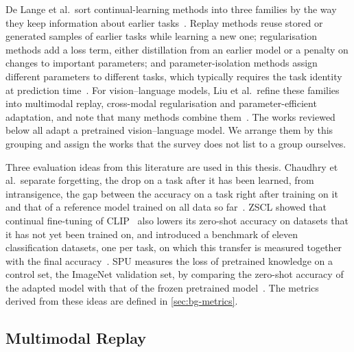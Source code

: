 De Lange et al.\ sort continual-learning methods into three families by the way they keep information about earlier tasks~\cite[Sec.~3]{delange2022}.
Replay methods reuse stored or generated samples of earlier tasks while learning a new one; regularisation methods add a loss term, either distillation from an earlier model or a penalty on changes to important parameters; and parameter-isolation methods assign different parameters to different tasks, which typically requires the task identity at prediction time~\cite[Sec.~3.1--3.3]{delange2022}.
For vision--language models, Liu et al.\ refine these families into multimodal replay, cross-modal regularisation and parameter-efficient adaptation, and note that many methods combine them~\cite[Sec.~4]{liu2026continuallearningvlmssurvey}.
The works reviewed below all adapt a pretrained vision--language model.
We arrange them by this grouping and assign the works that the survey does not list to a group ourselves.

Three evaluation ideas from this literature are used in this thesis.
Chaudhry et al.\ separate forgetting, the drop on a task after it has been learned, from intransigence, the gap between the accuracy on a task right after training on it and that of a reference model trained on all data so far~\cite{Chaudhry_2018}.
ZSCL showed that continual fine-tuning of CLIP~\cite{radford2021learningtransferablevisualmodels} also lowers its zero-shot accuracy on datasets that it has not yet been trained on, and introduced a benchmark of eleven classification datasets, one per task, on which this transfer is measured together with the final accuracy~\cite{zheng2023preventingzeroshottransferdegradation}.
SPU measures the loss of pretrained knowledge on a control set, the ImageNet validation set, by comparing the zero-shot accuracy of the adapted model with that of the frozen pretrained model~\cite{Zhang_2024_CVPR}.
The metrics derived from these ideas are defined in \cref{sec:bg-metrics}.

\subsection{Multimodal Replay}

